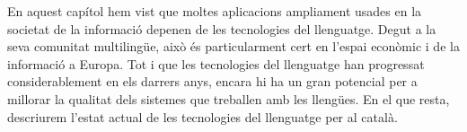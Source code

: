 \documentclass[]{../../metanetpaper}
\begin{document}
\begin{multicols}{2}
	En aquest capítol hem vist que moltes aplicacions ampliament usades en la societat de la informació depenen de les tecnologies del llenguatge. Degut a la seva comunitat multilingüe, això és particularment cert en l'espai econòmic i de la informació a Europa. Tot i que les tecnologies del llenguatge han progressat considerablement en els darrers anys, encara hi ha un gran potencial per a millorar la qualitat dels sistemes que treballen amb les llengües. En el que resta, descriurem l'estat actual de les tecnologies del llenguatge per al català. 
\end{multicols}

\clearpage


\end{document}
